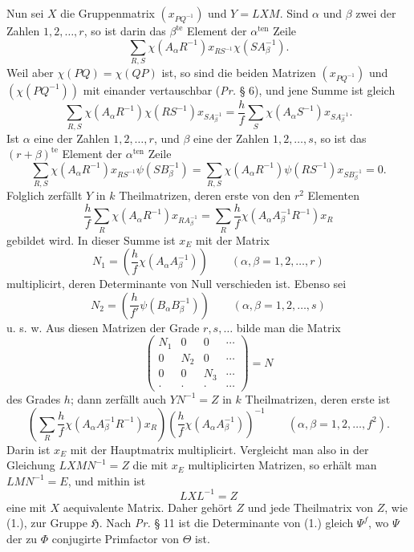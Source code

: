 \documentclass[11pt]{article}
\newcommand{\Hgrp}{\mathfrak{H}}
\newcommand{\ten}{\mathrm{ten}}
\newcommand{\te}{\mathrm{te}}
\begin{document}
Nun sei $X$ die Gruppenmatrix $(x_{PQ^{-1}})$ und $Y=LXM$. Sind $\alpha$ und $\beta$ zwei der Zahlen $1,2,\ldots,r$, so ist darin das $\beta^{\te}$ Element der $\alpha^{\ten}$ Zeile
\[
\sum_{R,S}\chi(A_\alpha R^{-1})x_{RS^{-1}}\chi(SA_\beta^{-1}).
\]
Weil aber $\chi(PQ)=\chi(QP)$ ist, so sind die beiden Matrizen $(x_{PQ^{-1}})$ und $(\chi(PQ^{-1}))$ mit einander vertauschbar (\emph{Pr.} § 6), und jene Summe ist gleich
\[
\sum_{R,S}\chi(A_\alpha R^{-1})\chi(RS^{-1})x_{SA_\beta^{-1}}=\frac{h}{f}\sum_S\chi(A_\alpha S^{-1})x_{SA_\beta^{-1}}.
\]
Ist $\alpha$ eine der Zahlen $1,2,\ldots,r$, und $\beta$ eine der Zahlen $1,2,\ldots,s$, so ist das $(r+\beta)^{\te}$ Element der $\alpha^{\ten}$ Zeile
\[
\sum_{R,S}\chi(A_\alpha R^{-1})x_{RS^{-1}}\psi(SB_\beta^{-1})
=\sum_{R,S}\chi(A_\alpha R^{-1})\psi(RS^{-1})x_{SB_\beta^{-1}}=0.
\]
Folglich zerfällt $Y$ in $k$ Theilmatrizen, deren erste von den $r^2$ Elementen
\[
\frac{h}{f}\sum_R\chi(A_\alpha R^{-1})x_{RA_\beta^{-1}}
=\sum_R\frac{h}{f}\chi(A_\alpha A_\beta^{-1}R^{-1})x_R
\]
gebildet wird. In dieser Summe ist $x_E$ mit der Matrix
\[
N_1=\left(\frac{h}{f}\chi(A_\alpha A_\beta^{-1})\right)\qquad(\alpha,\beta=1,2,\ldots,r)
\]
multiplicirt, deren Determinante von Null verschieden ist. Ebenso sei
\[
N_2=\left(\frac{h}{f'}\psi(B_\alpha B_\beta^{-1})\right)\qquad(\alpha,\beta=1,2,\ldots,s)
\]
u. s. w. Aus diesen Matrizen der Grade $r,s,\ldots$ bilde man die Matrix
\[
\begin{pmatrix}
N_1&0&0&\cdots\\
0&N_2&0&\cdots\\
0&0&N_3&\cdots\\
\cdot&\cdot&\cdot&\cdots
\end{pmatrix}=N
\]
des Grades $h$; dann zerfällt auch $YN^{-1}=Z$ in $k$ Theilmatrizen, deren erste ist
\begin{equation}\tag{1.}
\left(\sum_R\frac{h}{f}\chi(A_\alpha A_\beta^{-1}R^{-1})x_R\right)
\left(\frac{h}{f}\chi(A_\alpha A_\beta^{-1})\right)^{-1}\qquad(\alpha,\beta=1,2,\ldots,f^2).
\end{equation}
Darin ist $x_E$ mit der Hauptmatrix multiplicirt. Vergleicht man also in der Gleichung $LXMN^{-1}=Z$ die mit $x_E$ multiplicirten Matrizen, so erhält man $LMN^{-1}=E$, und mithin ist
\begin{equation}\tag{2.}
LX L^{-1}=Z
\end{equation}
eine mit $X$ aequivalente Matrix. Daher gehört $Z$ und jede Theilmatrix von $Z$, wie (1.), zur Gruppe $\Hgrp$. Nach \emph{Pr.} § 11 ist die Determinante von (1.) gleich $\Psi^f$, wo $\Psi$ der zu $\Phi$ conjugirte Primfactor von $\Theta$ ist.
\end{document}
